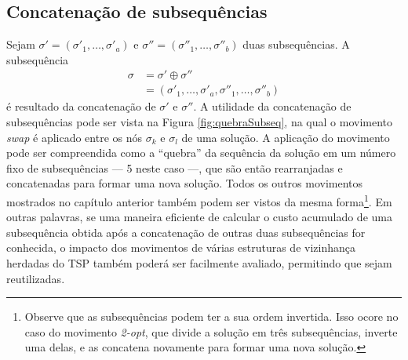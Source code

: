 \subsection{Concatenação de subsequências}
Sejam \(\sigma' = (\sigma'_1,\dots, \sigma'_a)\) e \(\sigma'' = (\sigma''_1, \dots, \sigma''_b)\) duas subsequências. A subsequência
\begin{align*}
    \sigma &= \sigma' \oplus \sigma'' \\
    &= (\sigma'_1,\dots,\sigma'_a,\sigma''_1,\dots,\sigma''_b)
\end{align*}
é resultado da concatenação de $\sigma'$ e $\sigma''$. A utilidade da concatenação de subsequências pode ser vista na Figura \ref{fig:quebraSubseq}, na qual o movimento \textit{swap} é aplicado entre os nós $\sigma_k$ e $\sigma_l$ de uma solução. A aplicação do movimento pode ser compreendida como a ``quebra'' da sequência da solução em um número fixo de subsequências --- 5 neste caso ---, que são então rearranjadas e concatenadas para formar uma nova solução. Todos os outros movimentos mostrados no capítulo anterior também podem ser vistos da mesma forma\footnote{Observe que as subsequências podem ter a sua ordem invertida. Isso ocore no caso do movimento \textit{2-opt}, que divide a solução em três subsequências, inverte uma delas, e as concatena novamente para formar uma nova solução.}. Em outras palavras, se uma maneira eficiente de calcular o custo acumulado de uma subsequência obtida após a concatenação de outras duas subsequências for conhecida, o impacto dos movimentos de várias estruturas de vizinhança herdadas do TSP também poderá ser facilmente avaliado, permitindo que sejam reutilizadas.


